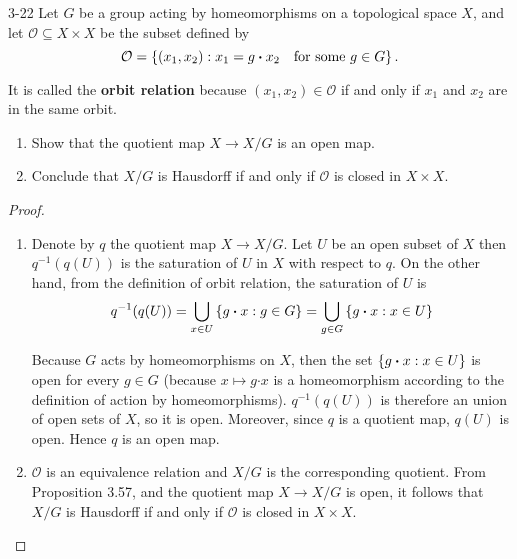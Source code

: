\begin{problem}{3-22}\label{problem:3-22}
Let $G$ be a group acting by homeomorphisms on a topological space $X$, and let $\mathcal{O} \subseteq X\times X$ be the subset defined by
\begin{equation*}
    \mathcal{O} = \left\{{(x_{1}, x_{2}) : x_{1} = g\boldsymbol{\cdot} x_{2} \quad\text{for some $g\in G$}}\right\}.
\end{equation*}

It is called the \textbf{orbit relation} because $(x_{1}, x_{2}) \in \mathcal{O}$ if and only if $x_{1}$ and $x_{2}$ are in the same orbit.
\begin{enumerate}[label={(\alph*)}]
    \item Show that the quotient map $X \to X/G$ is an open map.
    \item Conclude that $X/G$ is Hausdorff if and only if $\mathcal{O}$ is closed in $X\times X$.
\end{enumerate}
\end{problem}

\begin{proof}
    \begin{enumerate}[label={(\alph*)}]
        \item Denote by $q$ the quotient map $X \to X/G$. Let $U$ be an open subset of $X$ then $q^{-1}(q(U))$ is the saturation of $U$ in $X$ with respect to $q$. On the other hand, from the definition of orbit relation, the saturation of $U$ is
              \begin{align*}
                  q^{-1}(q(U)) = \bigcup_{x\in U} \left\{{g\boldsymbol{\cdot}x : g \in G}\right\} = \bigcup_{g\in G} \left\{{g\boldsymbol{\cdot} x : x\in U}\right\}
              \end{align*}

              Because $G$ acts by homeomorphisms on $X$, then the set $\left\{{ g\boldsymbol{\cdot} x : x\in U }\right\}$ is open for every $g\in G$ (because $x\mapsto g\boldsymbol{\cdot} x$ is a homeomorphism according to the definition of action by homeomorphisms). $q^{-1}(q(U))$ is therefore an union of open sets of $X$, so it is open. Moreover, since $q$ is a quotient map, $q(U)$ is open. Hence $q$ is an open map.
        \item $\mathcal{O}$ is an equivalence relation and $X/G$ is the corresponding quotient. From Proposition 3.57, and the quotient map $X\to X/G$ is open, it follows that $X/G$ is Hausdorff if and only if $\mathcal{O}$ is closed in $X\times X$.
    \end{enumerate}
\end{proof}

